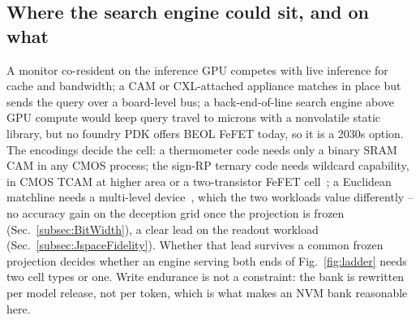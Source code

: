 \documentclass[conference]{IEEEtran}
\newcommand{\cam}{{CAM}\xspace}
\newcommand{\tcam}{{TCAM}\xspace}
\newcommand{\fefet}{{FeFET}\xspace}
\newcommand{\signrp}{{sign-RP}\xspace}
\begin{document}
\subsection{Where the search engine could sit, and on what}
\label{subsec:Placement}
\label{subsec:Devices}
A monitor co-resident on the inference GPU competes with live
inference for cache and bandwidth; a \cam or CXL-attached appliance matches in place but sends
the query over a board-level bus; a back-end-of-line search engine
above GPU compute would keep query travel to microns with a
nonvolatile static library, but no foundry PDK offers BEOL \fefet
today, so it is a 2030s option.
The encodings decide the cell: a thermometer code needs only a
binary SRAM \cam in any CMOS process; the \signrp ternary code needs
wildcard capability, in CMOS \tcam at higher area or a two-transistor
\fefet cell~\cite{ni2019fetcam}; a Euclidean matchline needs a
multi-level device~\cite{kazemi2021fefetcam}, which the two workloads
value differently -- no accuracy gain on the deception grid once the
projection is frozen (Sec.~\ref{subsec:BitWidth}), a clear lead on
the readout workload (Sec.~\ref{subsec:JspaceFidelity}). Whether that
lead survives a common frozen projection decides whether an engine
serving both ends of Fig.~\ref{fig:ladder} needs two cell types or
one. Write endurance is not a constraint: the bank is rewritten per
model release, not per token, which is what makes an NVM bank
reasonable here.
\end{document}
